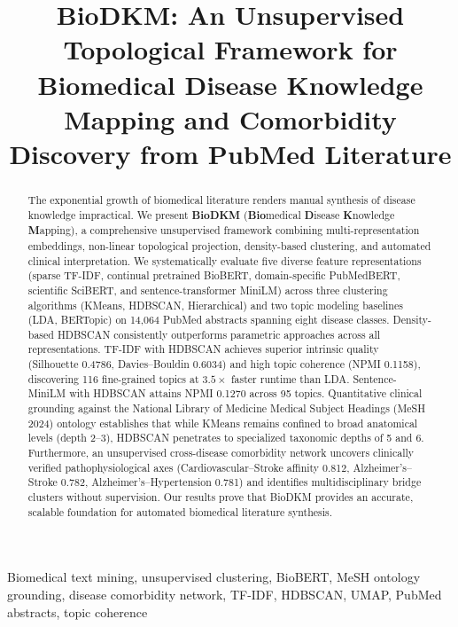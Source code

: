 \documentclass[a4paper,10pt,conference]{IEEEtran}
\begin{document}
\flushbottom

\title{BioDKM: An Unsupervised Topological Framework for Biomedical Disease Knowledge Mapping and Comorbidity Discovery from PubMed Literature}

\author{
}

\maketitle

\begin{abstract}
The exponential growth of biomedical literature renders manual synthesis of disease knowledge impractical. We present \textbf{BioDKM} (\textbf{Bio}medical \textbf{D}isease \textbf{K}nowledge \textbf{M}apping), a comprehensive unsupervised framework combining multi-representation embeddings, non-linear topological projection, density-based clustering, and automated clinical interpretation. We systematically evaluate five diverse feature representations (sparse TF-IDF, continual pretrained BioBERT, domain-specific PubMedBERT, scientific SciBERT, and sentence-transformer MiniLM) across three clustering algorithms (KMeans, HDBSCAN, Hierarchical) and two topic modeling baselines (LDA, BERTopic) on 14,064 PubMed abstracts spanning eight disease classes. Density-based HDBSCAN consistently outperforms parametric approaches across all representations. TF-IDF with HDBSCAN achieves superior intrinsic quality (Silhouette 0.4786, Davies--Bouldin 0.6034) and high topic coherence (NPMI 0.1158), discovering 116 fine-grained topics at $3.5\times$ faster runtime than LDA. Sentence-MiniLM with HDBSCAN attains NPMI 0.1270 across 95 topics. Quantitative clinical grounding against the National Library of Medicine Medical Subject Headings (MeSH 2024) ontology establishes that while KMeans remains confined to broad anatomical levels (depth 2--3), HDBSCAN penetrates to specialized taxonomic depths of 5 and 6. Furthermore, an unsupervised cross-disease comorbidity network uncovers clinically verified pathophysiological axes (Cardiovascular--Stroke affinity 0.812, Alzheimer's--Stroke 0.782, Alzheimer's--Hypertension 0.781) and identifies multidisciplinary bridge clusters without supervision. Our results prove that BioDKM provides an accurate, scalable foundation for automated biomedical literature synthesis.
\end{abstract}

\begin{IEEEkeywords}
Biomedical text mining, unsupervised clustering, BioBERT, MeSH ontology grounding, disease comorbidity network, TF-IDF, HDBSCAN, UMAP, PubMed abstracts, topic coherence
\end{IEEEkeywords}
\end{document}
